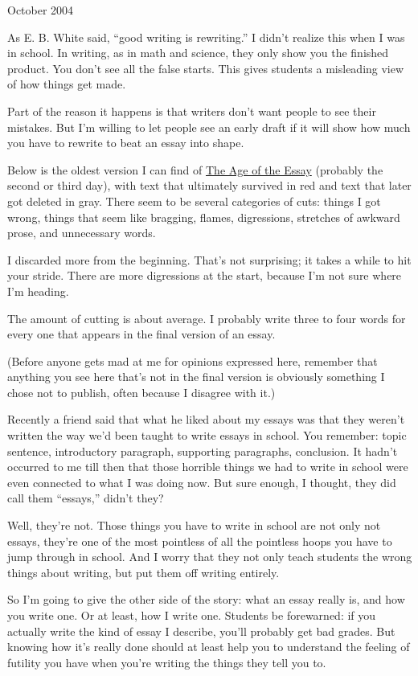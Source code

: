 October 2004

As E. B. White said, ``good writing is rewriting.'' I didn't realize
this when I was in school. In writing, as in math and science, they only
show you the finished product. You don't see all the false starts. This
gives students a misleading view of how things get made.

Part of the reason it happens is that writers don't want people to see
their mistakes. But I'm willing to let people see an early draft if it
will show how much you have to rewrite to beat an essay into shape.

Below is the oldest version I can find of \href{essay.html}{The Age of
the Essay} (probably the second or third day), with text that ultimately
survived in red and text that later got deleted in gray. There seem to
be several categories of cuts: things I got wrong, things that seem like
bragging, flames, digressions, stretches of awkward prose, and
unnecessary words.

I discarded more from the beginning. That's not surprising; it takes a
while to hit your stride. There are more digressions at the start,
because I'm not sure where I'm heading.

The amount of cutting is about average. I probably write three to four
words for every one that appears in the final version of an essay.

(Before anyone gets mad at me for opinions expressed here, remember that
anything you see here that's not in the final version is obviously
something I chose not to publish, often because I disagree with it.)

Recently a friend said that what he liked about my essays was that they
weren't written the way we'd been taught to write essays in school. You
remember: topic sentence, introductory paragraph, supporting paragraphs,
conclusion. It hadn't occurred to me till then that those horrible
things we had to write in school were even connected to what I was doing
now. But sure enough, I thought, they did call them ``essays,'' didn't
they?

Well, they're not. Those things you have to write in school are not only
not essays, they're one of the most pointless of all the pointless hoops
you have to jump through in school. And I worry that they not only teach
students the wrong things about writing, but put them off writing
entirely.

So I'm going to give the other side of the story: what an essay really
is, and how you write one. Or at least, how I write one. Students be
forewarned: if you actually write the kind of essay I describe, you'll
probably get bad grades. But knowing how it's really done should at
least help you to understand the feeling of futility you have when
you're writing the things they tell you to.

